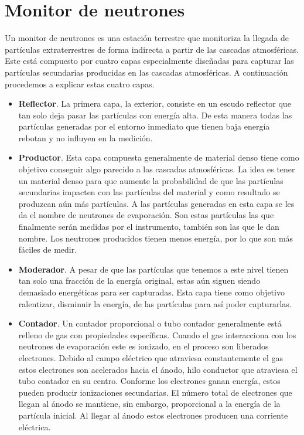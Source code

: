     \section{Monitor de neutrones}
        Un monitor de neutrones es una estación terrestre que monitoriza la llegada de partículas extraterrestres de forma indirecta a partir de las
        cascadas atmosféricas. Este está compuesto por cuatro capas especialmente diseñadas para capturar las partículas secundarias producidas en las
        cascadas atmosféricas. A continuación procedemos a explicar estas cuatro capas.
        \begin{itemize}
            \item	\textbf{Reflector}. La primera capa, la exterior, consiste en un escudo reflector que tan solo deja pasar las partículas con
                energía alta.  De esta manera todas las partículas generadas por el entorno inmediato que tienen baja energía rebotan y no
                influyen en la medición.
            \item	\textbf{Productor}. Esta capa compuesta generalmente de material denso tiene como objetivo conseguir algo parecido a las
                cascadas atmosféricas. La idea es tener un material denso para que aumente la probabilidad de que las partículas secundarias
                impacten con las partículas del material y como resultado se produzcan aún más partículas. A las partículas generadas en esta
                capa se les da el nombre de neutrones de evaporación. Son estas partículas las que finalmente serán medidas por el
                instrumento, también son las que le dan nombre. Los neutrones producidos tienen menos energía, por lo que son más fáciles de
                medir.
            \item	\textbf{Moderador}. A pesar de que las partículas que tenemos a este nivel tienen tan solo una fracción de la energía
                original, estas aún siguen siendo demasiado energéticas para ser capturadas. Esta capa tiene como objetivo ralentizar,
                disminuir la energía, de las partículas para así poder capturarlas.
            \item	\textbf{Contador}. Un contador proporcional o tubo contador generalmente está relleno de gas con propiedades específicas.
                Cuando el gas interacciona con los neutrones de evaporación este es ionizado, en el proceso son liberados electrones. Debido
                al campo eléctrico que atraviesa constantemente el gas estos electrones son acelerados hacia el ánodo, hilo conductor que
                atraviesa el tubo contador en su centro. Conforme los electrones ganan energía, estos pueden producir ionizaciones
                secundarias. El número total de electrones que llegan al ánodo se mantiene, sin embargo, proporcional a la energía de la
                partícula inicial. Al llegar al ánodo estos electrones producen una corriente eléctrica. 

        \end{itemize}
